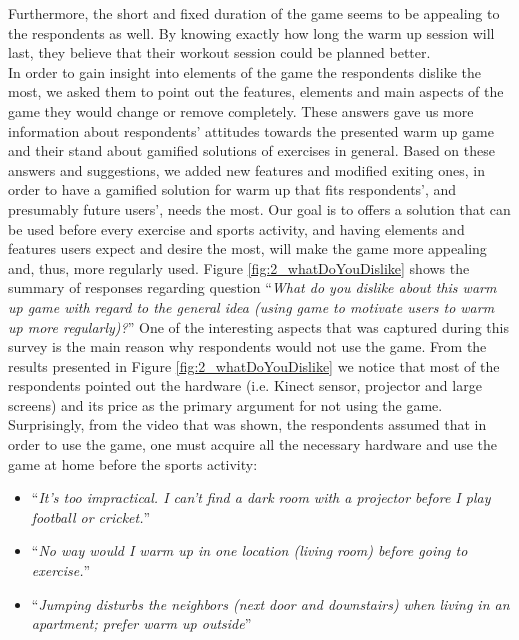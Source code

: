 Furthermore, the short and fixed duration of the game seems to be appealing to the respondents as well. By knowing exactly how long the warm up session will last, they believe that their workout session could be planned better.\\
In order to gain insight into elements of the game the respondents dislike the most, we asked them to point out the features, elements and main aspects of the game they would change or remove completely. These answers gave us more information about respondents' attitudes towards the presented warm up game and their stand about gamified solutions of exercises in general. Based on these answers and suggestions, we added new features and modified exiting ones, in order to have a gamified solution for warm up that fits respondents', and presumably future users', needs the most. Our goal is to offers a solution that can be used before every exercise and sports activity, and having elements and features users expect and desire the most, will make the game more appealing and, thus, more regularly used.
Figure \ref{fig:2_whatDoYouDislike} shows the summary of responses regarding question ``\textit{What do you dislike about this warm up game with regard to the general idea (using game to motivate users to warm up more regularly)?}''
One of the interesting aspects that was captured during this survey is the main reason why respondents would not use the game. From the results presented in Figure \ref{fig:2_whatDoYouDislike} we notice that most of the respondents pointed out the hardware (i.e. Kinect sensor, projector and large screens) and its price as the primary argument for not using the game. Surprisingly, from the video that was shown, the respondents assumed that in order to use the game, one must acquire all the necessary hardware and use the game at home before the sports activity:
\begin{itemize}
\item ``\textit{It's too impractical. I can't find a dark room with a projector before I play football or cricket.}''
\item ``\textit{No way would I warm up in one location (living room) before going to exercise.}''
\item ``\textit{Jumping disturbs the neighbors (next door and downstairs) when living in an apartment; prefer warm up outside}''
\end{itemize} 
